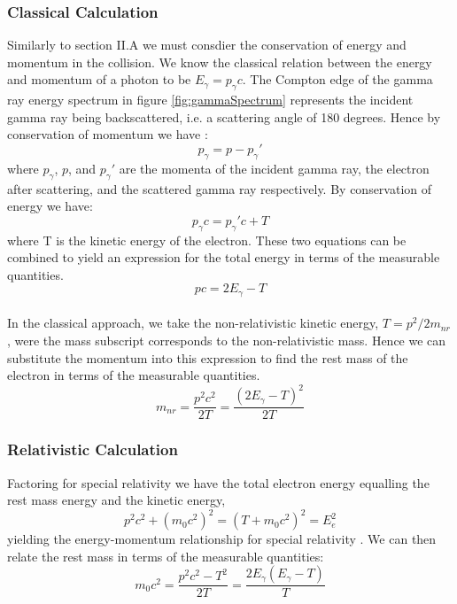 \documentclass[%
reprint,
amsmath,amssymb,
aps,
]{revtex4-2}
\begin{document}
			\subsubsection{Classical Calculation}
			Similarly to section II.A we must consdier the conservation of energy and momentum in the collision. We know the classical relation between the energy and momentum of a photon to be $E_\gamma = p_\gamma c$. The Compton edge of the gamma ray energy spectrum in figure \ref{fig:gammaSpectrum} represents the incident gamma ray being backscattered, i.e. a scattering angle of 180 degrees. Hence by conservation of momentum we have \cite{manual2}:
			\begin{equation}
				p_\gamma = p - p_\gamma '
			\end{equation}where $p_\gamma$, $p$, and $p_\gamma '$ are the momenta of the incident gamma ray, the electron after scattering, and the scattered gamma ray respectively. By conservation of energy we have:
			\begin{equation}
				p_\gamma c = p_\gamma 'c + T
			\end{equation}where T is the kinetic energy of the electron. These two equations can be combined to yield an expression for the total energy in terms of the measurable quantities.
			\begin{equation}
				pc = 2 E_\gamma - T
			\end{equation}\\
			
			In the classical approach, we take the non-relativistic kinetic energy, $T = p^2 / 2m_{nr}$, were the mass subscript corresponds to the non-relativistic mass. Hence we can substitute the momentum into this expression to find the rest mass of the electron in terms of the measurable quantities.
			\begin{equation}
				m_{nr} = \frac{p^2 c^2}{2T} = \frac{(2 E_\gamma - T)^2}{2T}
				\label{eq:classical}
			\end{equation}
			
			\subsubsection{Relativistic Calculation}
			Factoring for special relativity we have the total electron energy equalling the rest mass energy and the kinetic energy,
			\begin{equation}
				p^2 c^2 + (m_0 c^2)^2 = (T + m_0 c^2)^2 = E_e^2
			\end{equation}yielding the energy-momentum relationship for special relativity \cite{manual2}. We can then relate the rest mass in terms of the measurable quantities:
			\begin{equation}
				m_0 c^2 = \frac{p^2 c^2 - T^2}{2T} = \frac{2 E_\gamma (E_\gamma -T)}{T}
				\label{eq:relativistic}
			\end{equation}
		
\end{document}
